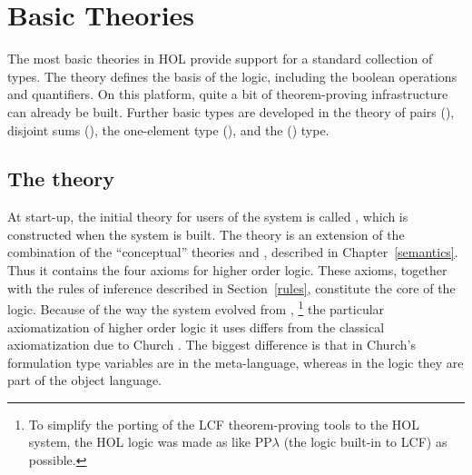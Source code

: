 \section{Basic Theories}

The most basic theories in HOL provide support for a standard
collection of types. The theory  defines the basis of
the \HOL{} logic, including the boolean operations and
quantifiers. On this platform, quite a bit of theorem-proving
infrastructure can already be built. Further basic types are developed
in the theory of pairs (), disjoint sums
(), the one-element type (), and the
() type.


\subsection{The theory }\label{boolfull}

%
At start-up, the initial theory for users of the \HOL{} system is
called , which is constructed when the
\HOL{} system is built. The theory  is an extension of
the combination of the ``conceptual'' theories  and
, described in Chapter~\ref{semantics}.  Thus it contains
the four axioms
%
%
for higher order logic. These axioms, together with the rules of
inference described in Section~\ref{rules}, constitute the core of the
\HOL{} logic.  Because of the way the \HOL{} system evolved from \LCF,
%
%
\footnote{To simplify the porting of the LCF theorem-proving tools to
  the HOL system, the HOL logic was made as like PP$\lambda$ (the
  logic built-in to LCF) as possible.} the particular
axiomatization
%
%
of higher order logic it uses differs from the classical
axiomatization due to Church  \cite{Church}.  The
biggest difference is that in Church's formulation type
variables
%
%
are in the meta-language, whereas in the \HOL{} logic they are part of
the object language.

